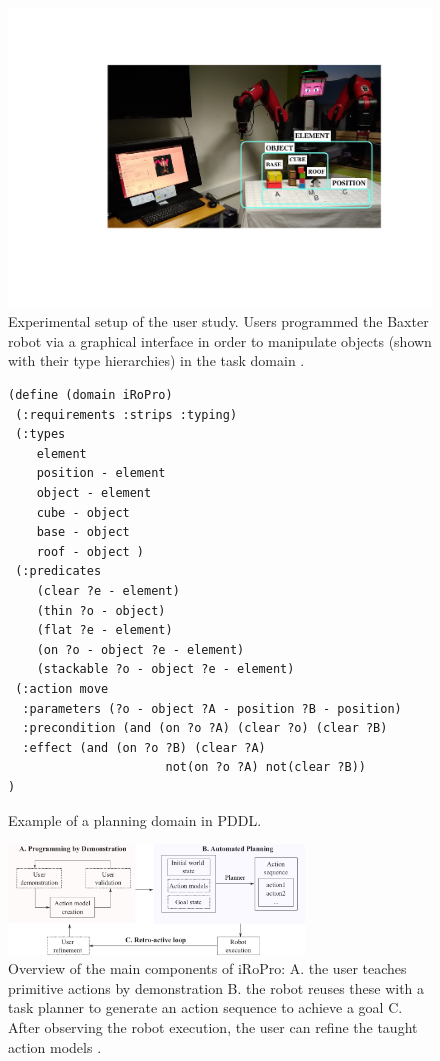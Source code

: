 \begin{figure}
	\centering
	\includegraphics[width=\linewidth]{Fig3.pdf}
	\caption{Experimental setup of the user study. Users programmed the Baxter robot via a graphical interface in order to manipulate objects (shown with their type hierarchies) in the task domain \cite{liang2019d}. } 
	\label{fig:dispositif}
\end{figure}

\begin{figure}
\begin{verbatim}
(define (domain iRoPro)
 (:requirements :strips :typing)
 (:types 
    element  
    position - element  
    object - element 
    cube - object 
    base - object 
    roof - object )
 (:predicates
    (clear ?e - element)
    (thin ?o - object)
    (flat ?e - element)
    (on ?o - object ?e - element)
    (stackable ?o - object ?e - element) 
 (:action move
  :parameters (?o - object ?A - position ?B - position)
  :precondition (and (on ?o ?A) (clear ?o) (clear ?B)
  :effect (and (on ?o ?B) (clear ?A)
                      not(on ?o ?A) not(clear ?B))
)
\end{verbatim}
    \caption{Example of a planning domain in PDDL.}
	\label{fig:pddl}
\end{figure}

\begin{figure}
	\centering
	\includegraphics[width=0.7\textwidth]{Fig5.png}
	\caption{Overview of the main components of iRoPro: A. the user teaches primitive actions by demonstration B. the robot reuses these with a task planner to generate an action sequence to achieve a goal
		C. After observing the robot execution, the user can refine the taught action models \cite{liang2017b}.}
	\label{fig:framework}
\end{figure}

